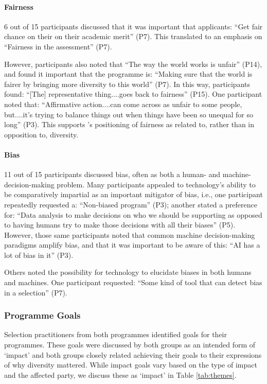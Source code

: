 \paragraph{Fairness}
6 out of 15 participants discussed that it was important that applicants: ``Get fair chance on their on their academic merit'' (P7). This translated to an emphasis on ``Fairness in the assessment'' (P7).

However, participants also noted that ``The way the world works is unfair'' (P14), and found it important that the programme is: ``Making sure that the world is fairer by bringing more diversity to this world'' (P7). In this way, participants found: ``[The] representative thing....goes back to fairness'' (P15). One participant noted that: ``Affirmative action....can come across as unfair to some people, but....it's trying to balance things out when things have been so unequal for so long'' (P3). This supports \textcite{zhao2023fairness}'s positioning of fairness as related to, rather than in opposition to, diversity. 

\paragraph{Bias}
11 out of 15 participants discussed bias, often as both a human- and machine-decision-making problem. Many participants appealed to technology's ability to be comparatively impartial as an important mitigator of bias, i.e., one participant repeatedly requested a: ``Non-biased program'' (P3); another stated a preference for: ``Data analysis to make decisions on who we should be supporting as opposed to having humans try to make those decisions with all their biases'' (P5). However, those same participants noted that common machine decision-making paradigms amplify bias, and that it was important to be aware of this: ``AI has a lot of bias in it'' (P3).

Others noted the possibility for technology to elucidate biases in both humans and machines. One participant requested: ``Some kind of tool that can detect bias in a selection'' (P7).

\subsubsection{Programme Goals}
Selection practitioners from both programmes identified goals for their programmes. These goals were discussed by both groups as an intended form of `impact' and both groups closely related achieving their goals to their expressions of why diversity mattered. While impact goals vary based on the type of impact and the affected party, we discuss these as `impact' in Table \ref{tab:themes}.

